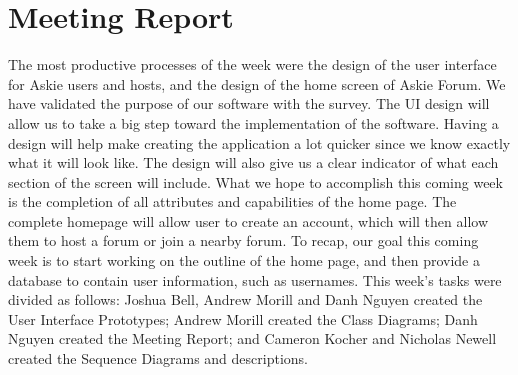 \documentclass[12pt]{article}
\begin{document}
\section{Meeting Report}
\begin{flushleft}
The most productive processes of the week were the design of the user interface for Askie users and hosts, and the design of the home screen of Askie Forum. We have validated the purpose of our software with the survey. The UI design will allow us to take a big step toward the implementation of the software. Having a design will help make creating the application a lot quicker since we know exactly what it will look like. The design will also give us a clear indicator of what each section of the screen will include. What we hope to accomplish this coming week is the completion of all attributes and capabilities of the home page. The complete homepage will allow user to create an account, which will then allow them to host a forum or join a nearby forum. To recap, our goal this coming week is to start working on the outline of the home page, and then provide a database to contain user information, such as usernames. This week's tasks were divided as follows: Joshua Bell, Andrew Morill and Danh Nguyen created the User Interface Prototypes; Andrew Morill created the Class Diagrams; Danh Nguyen created the Meeting Report; and Cameron Kocher and Nicholas Newell created the Sequence Diagrams and descriptions.
\end{flushleft}
\end{document}
